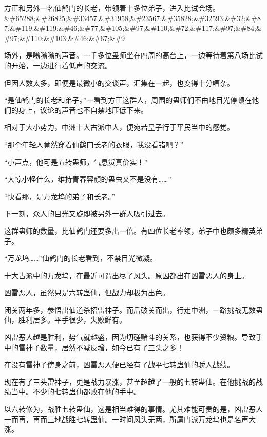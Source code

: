 
\begin{this_body}

方正和另外一名仙鹤门的长老，带领着十多位弟子，进入比试会场。\&\#65288;\&\#26825;\&\#33457;\&\#31958;\&\#23567;\&\#35828;\&\#32593;\&\#32;\&\#87;\&\#119;\&\#119;\&\#46;\&\#77;\&\#105;\&\#97;\&\#110;\&\#72;\&\#117;\&\#97;\&\#84;\&\#97;\&\#110;\&\#103;\&\#46;\&\#67;\&\#9

场外，是嗡嗡嗡的声音。一千多位蛊师坐在四周的高台上，一边等待着第八场比试的开始，一边进行着低声的交流。

但因人数太多，即便是最微小的交谈声，汇集在一起，也变得十分嘈杂。

“是仙鹤门的长老和弟子。”一看到方正这群人，周围的蛊师们不由地目光停顿在他们的身上，议论的声音也不自禁地压低下来。

相对于大小势力，中洲十大古派中人，便宛若皇子行于平民当中的感觉。

“那个年轻人竟然穿着仙鹤门长老的衣服，我没看错吧？”

“小声点，他可是五转蛊师，气息货真价实！”

“大惊小怪什么，维持青春容颜的蛊虫又不是没有……”

“快看那，是万龙坞的弟子和长老。”

下一刻，众人的目光又旋即被另外一群人吸引过去。

这群蛊师的数量，比仙鹤门还要多出一倍。有四位长老率领，弟子中也颇多精英弟子。

“万龙坞……”仙鹤门的长老看到，不禁目光微凝。

十大古派中的万龙坞，在最近可谓出尽了风头。原因都出在凶雷恶人的身上。

凶雷恶人，虽然只是六转蛊仙，但战力却极为出色。

闭关两年多，参悟出仙道杀招雷神子。而后破关而出，行走中洲，一路挑战无数蛊仙，胜利居多。平手很少，失败鲜有。

凶雷恶人越是胜利，势气就越盛，因为切磋赌斗的关系，也获得不少资粮。导致手中的雷神子数量，居然不减反增，如今已有了三头之多！

在没有雷神子傍身之前，凶雷恶人便已经有了战平七转蛊仙的骄人战绩。

现在有了三头雷神子，更是战力暴涨，甚至超越了一般的七转蛊仙。在他挑战的战绩当中。不少的七转蛊仙都败在他的手中。

以六转修为，战胜七转蛊仙，这是相当难得的事情。尤其难能可贵的是，凶雷恶人一而再，再而三地战胜七转蛊仙。一时间风头无两，所属门派万龙坞也是名声大涨。


\end{this_body}
